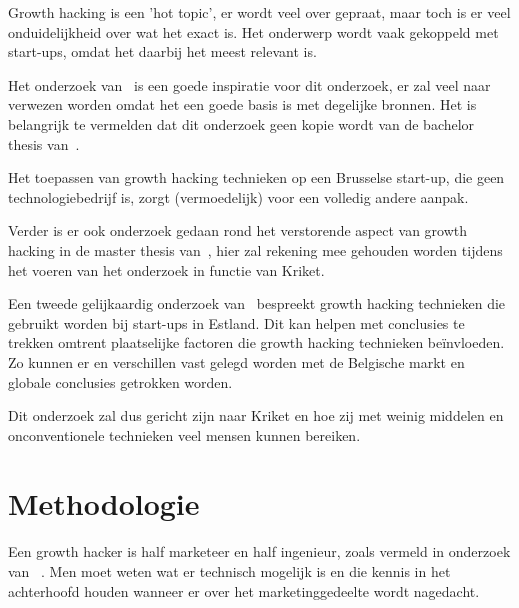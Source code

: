 Growth hacking is een 'hot topic', er wordt veel over gepraat, maar toch is er veel onduidelijkheid over wat het exact is. Het onderwerp wordt vaak gekoppeld met start-ups, omdat het daarbij het meest relevant is.

Het onderzoek van~\textcite{Lee2016} is een goede inspiratie voor dit onderzoek, er zal veel naar verwezen worden omdat het een goede basis is met degelijke bronnen. Het is belangrijk te vermelden dat dit onderzoek geen kopie wordt van de bachelor thesis van~\textcite{Lee2016}. 

Het toepassen van growth hacking technieken op een Brusselse start-up, die geen technologiebedrijf is, zorgt (vermoedelijk) voor een volledig andere aanpak. 

Verder is er ook onderzoek gedaan rond het verstorende aspect van growth hacking in de master thesis van~\textcite{Bergendal2017}, hier zal rekening mee gehouden worden tijdens het voeren van het onderzoek in functie van Kriket.

Een tweede gelijkaardig onderzoek van~\textcite{Vunk2017} bespreekt growth hacking technieken die gebruikt worden bij start-ups in Estland. Dit kan helpen met conclusies te trekken omtrent plaatselijke factoren die growth hacking technieken beïnvloeden. Zo kunnen er en verschillen vast gelegd worden met de Belgische markt en globale conclusies getrokken worden.

Dit onderzoek zal dus gericht zijn naar Kriket en hoe zij met weinig middelen en onconventionele technieken veel mensen kunnen bereiken.



\section{Methodologie}
\label{sec:methodologie}

Een growth hacker is half marketeer en half ingenieur, zoals vermeld in onderzoek van ~\cite{Lee2016}. Men moet weten wat er technisch mogelijk is en die kennis in het achterhoofd houden wanneer er over het marketinggedeelte wordt nagedacht. 


